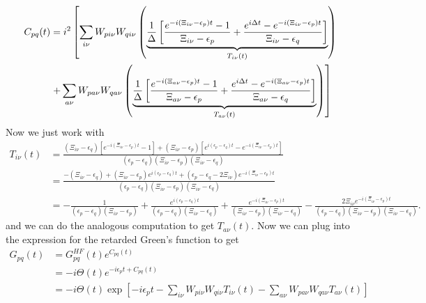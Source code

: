 \begin{align}
C_{pq}(t) &=  i^2\left[ \sum_{i\nu} W_{p i \nu} W_{q i \nu} \left(\underbrace{\frac{1}{\Delta}\left[\frac{e^{-i\left(\Xi_{i\nu} - \epsilon_p\right) t}-1 }{\Xi_{i\nu}-\epsilon_p} + \frac{e^{i\Delta t} - e^{-i\left(\Xi_{i\nu} - \epsilon_p\right) t}}{\Xi_{i\nu} - \epsilon_q}\right] }_{T_{i\nu}(t)}\right)\right.\\
& \left. + \sum_{a\nu} W_{p a \nu} W_{q a \nu} 
\left(\underbrace{\frac{1}{\Delta}\left[{\frac{e^{-i\left(\Xi_{a\nu} - \epsilon_p\right) t}-1 }{\Xi_{a\nu}-\epsilon_p} + \frac{e^{i\Delta t} - e^{-i\left(\Xi_{a\nu} - \epsilon_p\right) t}}{\Xi_{a\nu} - \epsilon_q}}\right]}_{T_{a\nu}(t)}\right) \right] \notag \\
\end{align}
Now we just work with
\begin{align}
    T_{i\nu}(t) &= \frac{ \left( \Xi_{i\nu} - \epsilon_q \right) \left[ e^{-i(\Xi_{i\nu} - \epsilon_p)t} - 1  \right] + \left( \Xi_{i\nu} - \epsilon_p \right) \left[ e^{i\left(\epsilon_p - \epsilon_q\right)t} - e^{-i(\Xi_{i\nu} - \epsilon_p)t} \right] }{ (\epsilon_p - \epsilon_q)(\Xi_{i\nu} - \epsilon_p)(\Xi_{i\nu} - \epsilon_q) } \\
&= \frac{- \left( \Xi_{i\nu} - \epsilon_q \right) + \left( \Xi_{i\nu} - \epsilon_p \right) e^{i\left(\epsilon_p - \epsilon_q\right)t} + \left( \epsilon_p - \epsilon_q - 2\Xi_{i\nu} \right) e^{-i(\Xi_{i\nu} - \epsilon_p)t} }{ (\epsilon_p - \epsilon_q)(\Xi_{i\nu} - \epsilon_p)(\Xi_{i\nu} - \epsilon_q) } \\
&= -\frac{1}{\left(\epsilon_p-\epsilon_q\right)\left(\Xi_{i\nu}-\epsilon_p\right)}+\frac{e^{i\left(\epsilon_p-\epsilon_q\right) t}}{\left(\epsilon_p-\epsilon_q\right)\left(\Xi_{i\nu}-\epsilon_q\right)}+\frac{e^{-i\left(\Xi_{i\nu}-\epsilon_p\right) t}}{\left(\Xi_{i\nu}-\epsilon_p\right)\left(\Xi_{i\nu}-\epsilon_q\right)}-\frac{2 \Xi_{i\nu} e^{-i\left(\Xi_{i\nu}-\epsilon_p\right) t}}{\left(\epsilon_p-\epsilon_q\right)\left(\Xi_{i\nu}-\epsilon_p\right)(\Xi_{i\nu}-\epsilon_q)} .
\end{align}
and we can do the analogous computation to get $T_{a\nu}(t)$.
Now we can plug into the expression for the retarded Green's function to get
\begin{align}
    G_{pq}(t) & = G_{pq}^{HF}(t) e^{C_{pq}(t)} \\
& = -i \Theta(t) e^{-i \epsilon_p t + C_{pq}(t)} \\
& = -i \Theta(t) \exp\left[-i \epsilon_p t - \sum_{i\nu} W_{p i \nu} W_{q i \nu} T_{i\nu}(t) - \sum_{a\nu} W_{p a \nu} W_{q a \nu} T_{a\nu}(t) \right] \\
\end{align}
